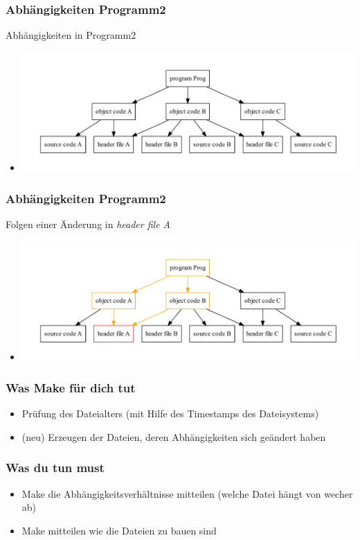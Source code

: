 \begin{frame}
	\frametitle{Abhängigkeiten Programm2}
	Abhängigkeiten in Programm2
    \begin{itemize}
      \item<2->[] \includegraphics[scale=0.41]{prog2-dep.pdf}      
    \end{itemize}
\end{frame}


\begin{frame}
	\frametitle{Abhängigkeiten Programm2}
	Folgen einer Änderung in \textit{header file A}
    \begin{itemize}
      \item<2->[] \includegraphics[scale=0.41]{prog2-dep-hl.pdf}      
    \end{itemize}
\end{frame}

\begin{frame}
	\frametitle{Was Make für dich tut}
    \begin{itemize}
      \item<2-> \large{Prüfung des Dateialters (mit Hilfe des Timestamps des Dateisystems)}
      \item<3-> \large{(neu) Erzeugen der Dateien, deren Abhängigkeiten sich geändert haben}       
    \end{itemize}
\end{frame}

\begin{frame}
	\frametitle{Was du tun must}
    \begin{itemize}
      \item<2-> \large{Make die Abhängigkeitsverhältnisse mitteilen (welche Datei hängt von wecher ab)}
      \item<3-> \large{Make mitteilen wie die Dateien zu bauen sind} 
    \end{itemize}
\end{frame}
